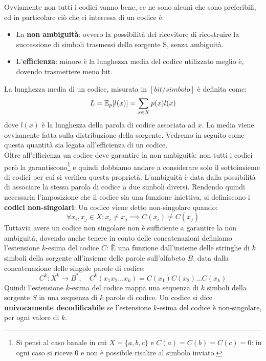 Ovviamente non tutti i codici vanno bene, ce ne sono alcuni che sono preferibili, ed in particolare ciò che ci interessa di un codice è:
\begin{itemize}
    \item La \textbf{non ambiguit\`a}: ovvero la possibilità del ricevitore di ricostruire la successione di simboli 
trasmessi della sorgente S, senza ambiguità.
    \item L'\textbf{efficienza}: minore \`e la lunghezza media del codice utilizzato meglio è, dovendo trasmettere meno bit.
\end{itemize}
 La lunghezza media di un codice, misurata in $[bit/simbolo]$ è definita come:
\begin{equation}
    L = \mathbb{E}_p[l(x)] = \sum_{x \in X} p(x)l(x)
\end{equation}
dove $l(x)$ \`e la lunghezza della parola di codice associata ad $x$. La media viene ovviamente fatta sulla distribuzione della sorgente. Vedremo in seguito come questa quantit\`a sia legata all'efficienza di un codice.\\
Oltre all’efficienza un codice  deve  garantire  la non  ambiguità: non  tutti  i  codici per\`o la garantiscono\footnote{Si pensi al caso banale in cui $X = \{a,b,c\}$ e $C(a)=C(b)=C(c)=0$: in ogni caso si riceve $0$ e non \`e possibile risalire al simbolo inviato.} e  quindi  dobbiamo  andare  a  considerare solo  il  sottoinsieme di codici per cui si verifica questa propriet\`a. L’ambiguità è data dalla possibilit\`a di associare la stessa parola di codice a due simboli diversi. Rendendo quindi necessaria l'imposizione che il codice sia una funzione iniettiva, si definiscono i \textbf{codici non-singolari}:
 Un codice viene detto non-singolare quando:
\begin{equation}
    \forall x_i, x_j \in X : x_i \neq x_j \implies C(x_i) \neq C(x_j)
\end{equation}
Tuttavia avere un codice non singolare non è sufficiente a garantire la non ambiguità, dovendo anche tenere in conto delle concatenazioni definiamo l'estensione $k$-esima del codice $C$:
 \`E una funzione dall'insieme delle stringhe di $k$ simboli della sorgente all'insieme delle parole sull'alfabeto $B$, data dalla concatenazione delle singole parole di codice:
\begin{equation}
    C^k : X^k \to B^*, \quad C^k(x_1 x_2 \dots x_k) = C(x_1)C(x_2)\dots C(x_k)
\end{equation}
Quindi l’estensione $k$-esima del codice mappa una sequenza di $k$ simboli della sorgente $S$ in una sequenza di $k$ parole di codice.
 Un codice si dice \textbf{univocamente decodificabile} se l’estensione $k$-esima del codice è non-singolare, per ogni valore di $k$.

